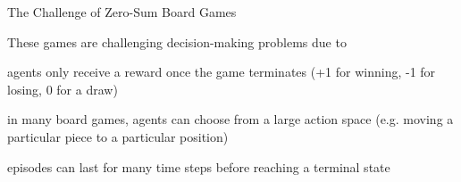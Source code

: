 \begin{frame}[t]{The Challenge of Zero-Sum Board Games}
    \pause

     These games are challenging decision-making problems due to
    \blist
        \item<2->  agents only receive a reward once the game terminates (+1 for winning, -1 for losing, 0 for a draw)
        \item<3->  in many board games, agents can choose from a large action space (e.g. moving a particular piece to a particular position)
        \item<4->  episodes can last for many time steps before reaching a terminal state
    \elist

\end{frame}

